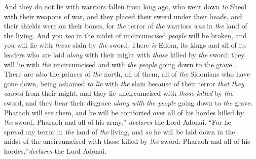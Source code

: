 \begin{biblechapter}
\verse And they do not lie with warriors fallen from long ago, who went down \textit{to} Sheol with their weapons of war, and they placed their sword under their heads, and their shields were on their bones, for \textit{the} terror of \textit{the} warriors \textit{was} in \textit{the} land of the living.
\verse And you \textit{too} in the midst of uncircumcised \textit{people} will be broken, and you will lie with \textit{those} slain by \textit{the} sword.
\verse There \textit{is} Edom, its kings and all of its leaders who are laid \textit{along} with their might with \textit{those} killed by \textit{the} sword; they will lie with \textit{the} uncircumcised and with \textit{the people} going down to the grave.
\verse There are \textit{also} the princes of \textit{the} north, all of them, all of \textit{the} Sidonians who have gone down, being ashamed \textit{to lie} with \textit{the} slain because of their terror \textit{that they caused} from their might, and they lie uncircumcised with \textit{those killed} by \textit{the} sword, and they bear their disgrace \textit{along with} \textit{the people} going down to \textit{the} grave.
\verse Pharaoh will see them, and he will be comforted over all of his hordes killed by \textit{the} sword, Pharaoh and all of his army,” \textit{declares} the Lord Adonai.
\verse “For he spread my terror in \textit{the} land of \textit{the} living, and \textit{so} he will be laid down in the midst of the uncircumcised with those killed by \textit{the} sword: Pharaoh and all of his hordes,”\textit{declares} the Lord Adonai.
\end{biblechapter}

